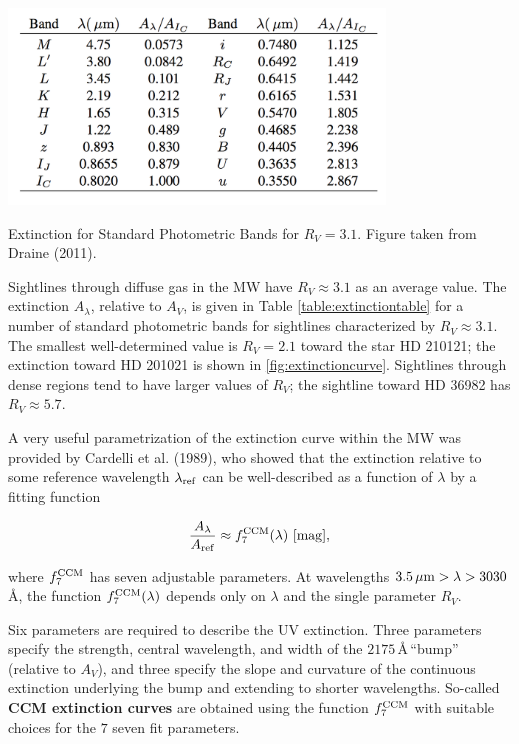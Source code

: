 \documentclass[a4paper,10pt]{article}
\begin{document}
\begin{table}[t]
    \centering
    \includegraphics[width=10cm]{figures/ExtinctionTable.png}
    \caption{\footnotesize{Extinction for Standard Photometric Bands for $R_V=3.1$. Figure taken from Draine (2011).}}
    \label{table:extinctiontable}
\end{table}

{\noindent}Sightlines through diffuse gas in the MW have $R_V\approx3.1$ as an average value. The extinction $A_\lambda$, relative to $A_V$, is given in Table \ref{table:extinctiontable} for a number of standard photometric bands for sightlines characterized by $R_V\approx3.1$. The smallest well-determined value is $R_V=2.1$ toward the star HD 210121; the extinction toward HD 201021 is shown in \ref{fig:extinctioncurve}. Sightlines through dense regions tend to have larger values of $R_V$; the sightline toward HD 36982 has $R_V\approx5.7$.

{\noindent}A very useful parametrization of the extinction curve within the MW was provided by Cardelli et al. (1989), who showed that the extinction relative to some reference wavelength $\lambda_{\rm ref}$ can be well-described as a function of $\lambda$ by a fitting function

\begin{align*}
    \frac{A_\lambda}{A_{\rm ref}} \approx f_7^{\rm CCM}(\lambda) ~ [{\rm mag}],
\end{align*}

{\noindent}where $f_7^{\rm CCM}$ has seven adjustable parameters. At wavelengths $3.5\,\mu{\rm m}>\lambda>3030$\,\AA, the function $f_7^{\rm CCM}(\lambda)$ depends only on $\lambda$ and the single parameter $R_V$.

{\noindent}Six parameters are required to describe the UV extinction. Three parameters specify the strength, central wavelength, and width of the $2175$\,\AA\,``bump'' (relative to $A_V$), and three specify the slope and curvature of the continuous extinction underlying the bump and extending to shorter wavelengths. So-called \textbf{CCM extinction curves} are obtained using the function $f_7^{\rm CCM}$ with suitable choices for the $7$ seven fit parameters.
\end{document}
